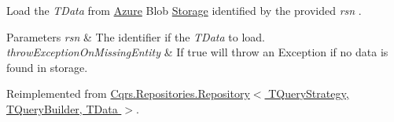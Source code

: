 Load the {\itshape T\+Data}  from \hyperlink{namespaceCqrs_1_1Azure}{Azure} Blob \hyperlink{namespaceCqrs_1_1Azure_1_1Storage}{Storage} identified by the provided {\itshape rsn} . 


\begin{DoxyParams}{Parameters}
{\em rsn} & The identifier if the {\itshape T\+Data}  to load.\\
\hline
{\em throw\+Exception\+On\+Missing\+Entity} & If true will throw an Exception if no data is found in storage.\\
\hline
\end{DoxyParams}


Reimplemented from \hyperlink{classCqrs_1_1Repositories_1_1Repository_a444e9dfe4710be90940dbb6dec9d856f_a444e9dfe4710be90940dbb6dec9d856f}{Cqrs.\+Repositories.\+Repository$<$ T\+Query\+Strategy, T\+Query\+Builder, T\+Data $>$}.

